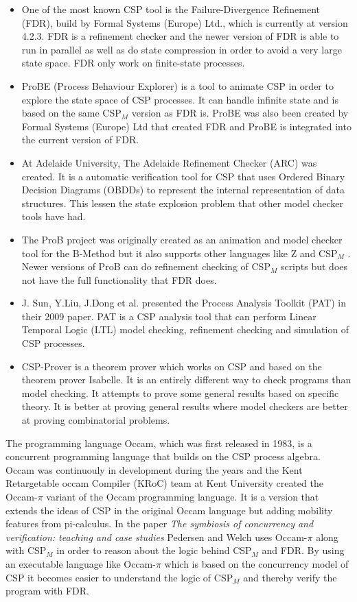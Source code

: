 \documentclass[a4paper]{report}
\newcommand{\cspm}{CSP$_M$ }
\begin{document}
\begin{itemize}
\item One of the most known CSP tool is the Failure-Divergence Refinement (FDR), build by Formal Systems (Europe) Ltd., which is currently at version 4.2.3\cite{fdr}. FDR is a refinement checker and the newer version of FDR is able to run in parallel as well as do state compression in order to avoid a very large state space. FDR only work on finite-state processes. 
\item ProBE (Process Behaviour Explorer)\cite{probe} is a tool to animate CSP in order to explore the state space of CSP processes. It can handle infinite state and is based on the same \cspm version as FDR is. ProBE was also been created by Formal Systems (Europe) Ltd that created FDR and ProBE is integrated into the current version of FDR. 
\item At Adelaide University, The Adelaide Refinement Checker (ARC)\cite{Parashkevov1996} was created. It is a automatic verification tool for CSP that uses Ordered Binary Decision Diagrams (OBDDs) to represent the internal representation of data structures. This lessen the state explosion problem that other model checker tools have had. 
\item The ProB project\cite{ProB}\cite{Leuschel2003} was originally created as an animation and model checker tool for the B-Method\cite{Abrial1988} but it also supports other languages like Z and \cspm. Newer versions of ProB can do refinement checking of \cspm scripts but does not have the full functionality that FDR does.
\item J. Sun, Y.Liu, J.Dong et al. presented the Process Analysis Toolkit (PAT) in their 2009 paper\cite{Sun2009}. PAT is a CSP analysis tool that can perform Linear Temporal Logic (LTL) model checking, refinement checking and simulation of CSP processes.
\item CSP-Prover\cite{Isobe2005} is a theorem prover which works on CSP and based on the theorem prover Isabelle. It is an entirely different way to check programs than model checking. It attempts to prove some general results based on specific theory. It is better at proving general results where model checkers are better at proving combinatorial problems.
\end{itemize}
The programming language Occam\cite{Occam1995}, which was first released in 1983, is a concurrent programming language that builds on the CSP process algebra. Occam was continuouly in development during the years and the Kent Retargetable occam Compiler (KRoC) team at Kent University created the Occam-$\pi$\cite{UniveristyofKent} variant of the Occam programming language. It is a version that extends the ideas of CSP in the original Occam language but adding mobility features from pi-calculus. In the paper \textit{The symbiosis of concurrency and verification: teaching and case studies}\cite{Pedersen2018} Pedersen and Welch uses Occam-$\pi$ along with \cspm in order to reason about the logic behind \cspm and FDR. By using an executable language like Occam-$\pi$ which is based on the concurrency model of CSP it becomes easier to understand the logic of \cspm and thereby verify the program with FDR.\\\\
\end{document}
